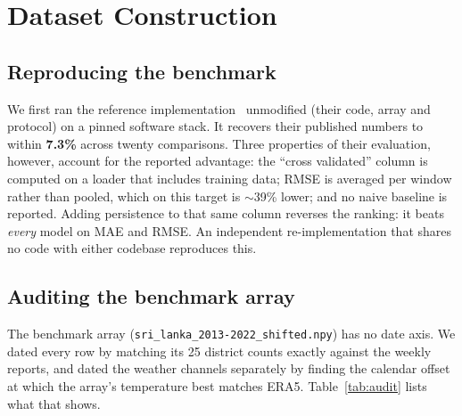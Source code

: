 \section{Dataset Construction}
\label{sec:data}

\subsection{Reproducing the benchmark}
\label{sec:repro}
We first ran the reference implementation~\cite{weng2024graph} unmodified (their
code, array and protocol) on a pinned software stack. It recovers their published
numbers to within \textbf{7.3\%} across twenty comparisons. Three properties of their
evaluation, however, account for the reported advantage: the ``cross validated''
column is computed on a loader that includes training data; RMSE is averaged per
window rather than pooled, which on this target is $\sim$39\% lower; and no naive
baseline is reported. Adding persistence to that same column reverses the ranking:
it beats \emph{every} model on MAE and RMSE. An independent re-implementation that
shares no code with either codebase reproduces this.

\subsection{Auditing the benchmark array}
\label{sec:audit}
The benchmark array (\texttt{sri\_lanka\_2013-2022\_shifted.npy}) has no date
axis. We dated every row by matching its 25 district counts exactly against the
weekly reports, and dated the weather channels separately by finding the
calendar offset at which the array's temperature best matches ERA5.
Table~\ref{tab:audit} lists what that shows.

